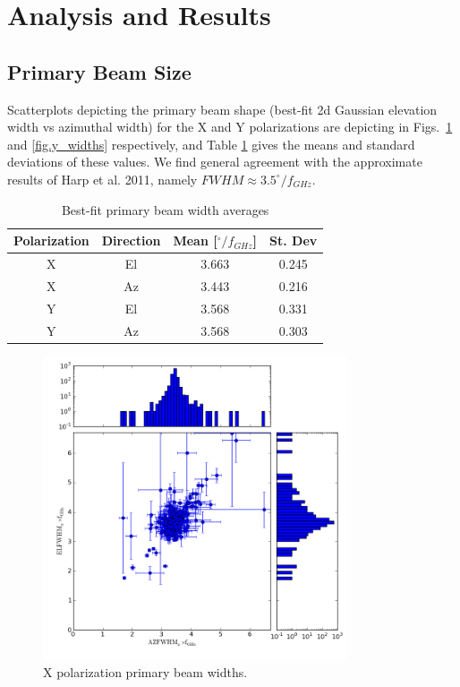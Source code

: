 \documentclass[preprint]{aastex}
\begin{document}
\section{Analysis and Results}\label{s.results}

\subsection{Primary Beam Size}\label{ss.beamsize}
Scatterplots depicting the primary beam shape (best-fit 2d Gaussian elevation width vs azimuthal width) for the X and Y polarizations are depicting in Figs.~\ref{fig.x_widths} and \ref{fig.y_widths} respectively, and Table \ref{tab.widths} gives the means and standard deviations of these values.  We find general agreement with the approximate results of Harp et al. 2011\cite{Harp2011}, namely $FWHM \approx 3.5^{\circ} / f_{GHz}$.

\begin{table}[!h]
\begin{center}
\begin{tabular}{|c|c|c|c|} \hline
Polarization & Direction & Mean [$^{\circ} / f_{GHz}$] & St. Dev \\
\hline
\hline
X & El & 3.663 & 0.245\\
\hline
X & Az & 3.443 & 0.216 \\
\hline
Y & El & 3.568 & 0.331 \\
\hline
Y & Az & 3.568 & 0.303\\
\hline
\end{tabular}
\caption{Best-fit primary beam width averages \label{tab.widths}}
\end{center}
\end{table}

\begin{figure}[h!]
\begin{center}
\includegraphics[width=0.8\textwidth]{images/x_widths.png}
\caption{X polarization primary beam widths. \label{fig.x_widths}}
\end{center}
\end{figure}
\end{document}
